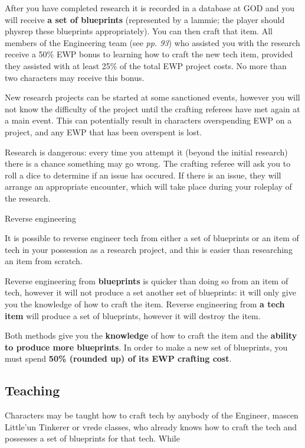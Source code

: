 After you have completed research it is recorded in a database at GOD and you will receive \textbf{a set of blueprints} (represented by a lammie; the player should physrep these blueprints appropriately). You can then craft that item. All members of the Engineering team (see \textit{pp. 93}) who assisted you with the research receive a 50\% EWP bonus to learning how to craft the new tech item, provided they assisted with at least 25\% of the total EWP project costs. No more than two characters may receive this bonus.

New research projects can be started at some sanctioned events, however you will not know the difficulty of the project until the crafting referees have met again at a main event. This can potentially result in characters overspending EWP on a project, and any EWP that has been overspent is lost.

Research is dangerous: every time you attempt it (beyond the initial research) there is a chance something may go wrong. The crafting referee will ask you to roll a dice to determine if an issue has occured. If there is an issue, they will arrange an appropriate encounter, which will take place during your roleplay of the research.

Reverse engineering

It is possible to reverse engineer tech from either a set of blueprints or an item of tech in your possession as a research project, and this is easier than researching an item from scratch.

Reverse engineering from \textbf{blueprints} is quicker than doing so from an item of tech, however it will not produce a set another set of blueprints: it will only give you the knowledge of how to craft the item. Reverse engineering from \textbf{a tech item} will produce a set of blueprints, however it will destroy the item.

Both methods give you the \textbf{knowledge} of how to craft the item and the \textbf{ability to produce more blueprints}. In order to make a new set of blueprints, you must spend \textbf{50\% (rounded up) of its EWP crafting cost}.

    \subsection{Teaching}

Characters may be taught how to craft tech by anybody of the Engineer, mascen Little'un Tinkerer or vrede classes, who already knows how to craft the tech and possesses a set of blueprints for that tech. While


